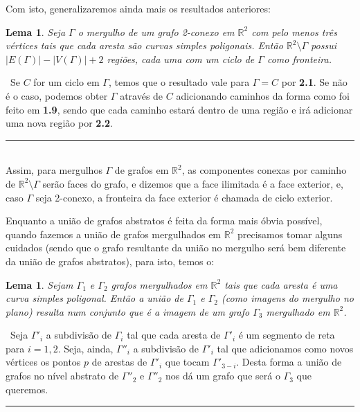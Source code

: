 \documentclass[12pt,a4paper]{article}
\newtheorem{lem}[mydef]{Lema}
\def\dem{\par\smallbreak\noindent {\textit{ Demonstração:}} \ }
\def\eop{\hfill\rule{2.5mm}{2.5mm} \\ }
\theoremstyle{definition}
\begin{document}
Com isto, generalizaremos ainda mais os resultados anteriores:

\begin{lem}

    Seja $\Gamma$ o mergulho de um grafo 2-conexo em $\mathbb{R}^2$ com pelo menos três vértices tais que cada aresta são curvas simples poligonais. Então $\mathbb{R}^2\setminus \Gamma$ possui $|E(\Gamma)|-|V(\Gamma)|+2$ regiões, cada uma com um ciclo de $\Gamma$ como fronteira.

\end{lem}

\dem Se $C$ for um ciclo em $\Gamma$, temos que o resultado vale para $\Gamma=C$ por \textbf{2.1}. Se não é o caso, podemos obter $\Gamma$ através de $C$ adicionando caminhos da forma como foi feito em \textbf{1.9}, sendo que cada caminho estará dentro de uma região e irá adicionar uma nova região por \textbf{2.2}. \eop

Assim, para mergulhos $\Gamma$ de grafos em $\mathbb{R}^2$, as componentes conexas por caminho de $\mathbb{R}^2\setminus \Gamma$ serão faces do grafo, e dizemos que a face ilimitada é a face exterior, e, caso $\Gamma$ seja 2-conexo, a fronteira da face exterior é chamada de ciclo exterior. 

Enquanto a união de grafos abstratos é feita da forma mais óbvia possível, quando fazemos a união de grafos mergulhados em $\mathbb{R}^2$ precisamos tomar alguns cuidados (sendo que o grafo resultante da união no mergulho será bem diferente da união de grafos abstratos), para isto, temos o:

\begin{lem}

    Sejam $\Gamma_1$ e $\Gamma_2$ grafos mergulhados em $\mathbb{R}^2$ tais que cada aresta é uma curva simples poligonal. Então a união de $\Gamma_1$ e $\Gamma_2$ (como imagens do mergulho no plano) resulta num conjunto que é a imagem de um grafo $\Gamma_3$ mergulhado em $\mathbb{R}^2$.

\end{lem} 

\dem Seja $\Gamma'_i$ a subdivisão de $\Gamma_i$ tal que cada aresta de $\Gamma'_i$ é um segmento de reta para $i=1,2$. Seja, ainda, $\Gamma''_i$ a subdivisão de $\Gamma'_i$ tal que adicionamos como novos vértices os pontos $p$ de arestas de $\Gamma'_i$ que tocam $\Gamma'_{3-i}$. Desta forma a união de grafos no nível abstrato de $\Gamma''_2$ e $\Gamma''_2$ nos dá um grafo que será o $\Gamma_3$ que queremos. \eop
\end{document}
